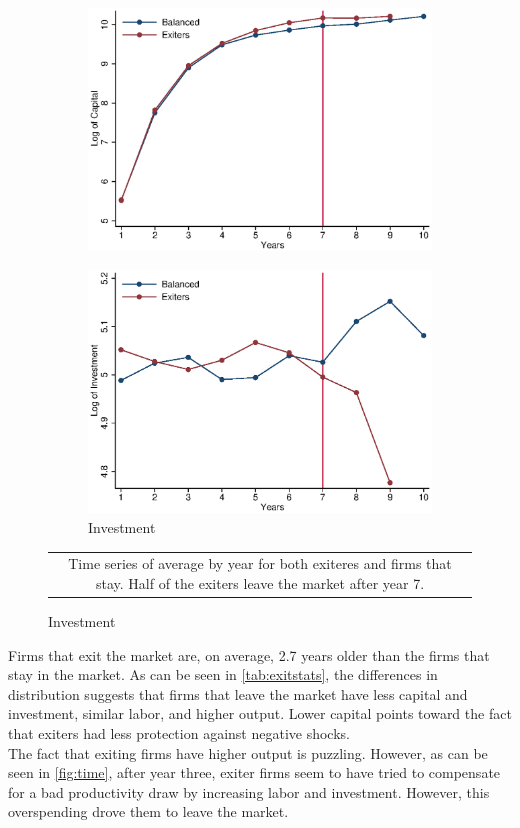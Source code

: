 \documentclass[11pt]{article}
\begin{document}
\begin{figure}[h!]
\begin{subfigure}[b]{.3\textwidth}
		\includegraphics[width=\textwidth]{out/timeK.eps}
	\end{subfigure}
	\begin{subfigure}[b]{.3\textwidth}
		\centering
		\caption{Investment}
		\includegraphics[width=\textwidth]{out/timeI.eps}
	\end{subfigure}
\begin{tabular*}{1\textwidth}{c}
	\multicolumn{1}{p{1\hsize}}{\footnotesize Time series of average by year for both exiteres and firms that stay. Half of the exiters leave the market after year 7.}\\
\end{tabular*}      	  
\end{figure}

Firms that exit the market are, on average, 2.7 years older than the firms that stay in the market. As can be seen in \autoref{tab:exitstats}, the differences in distribution suggests that firms that leave the market have less capital and investment, similar labor, and higher output. Lower capital points toward the fact that exiters had less protection against negative shocks. \\
The fact that exiting firms have higher output is puzzling. However, as can be seen in \autoref{fig:time}, after year three, exiter firms seem to have tried to compensate for a bad productivity draw by increasing labor and investment. However, this overspending drove them to leave the market.
\end{document}
